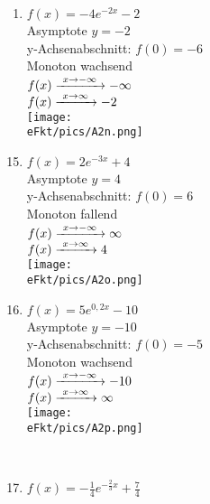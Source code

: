 \begin{Answer}[ref=eFktA2]
\begin{minipage}{\textwidth}
\begin{minipage}[t]{0.49\textwidth}
\begin{enumerate}[label=\alph*)]
				\item \(f(x)=-4e^{-2x}-2\)\\
				Asymptote \(y=-2\)\\
				y-Achsenabschnitt: \(f(0)=-6\)\\
				Monoton wachsend\\
				\(f(x)\xrightarrow{\hphantom{\ }x\to-\infty\hphantom{\ }}-\infty\)\\
				\(f(x)\xrightarrow{\hphantom{\ }x\to\infty\hphantom{\ }}-2\)\\
				\texttt{[image: \\eFkt/pics/A2n.png]}
			\end{enumerate}
		\end{minipage}
		\begin{minipage}[t]{0.49\textwidth}
			\begin{enumerate}[label=\alph*)]
				\setcounter{enumi}{14}
				\item \(f(x)=2e^{-3x}+4\)\\
				Asymptote \(y=4\)\\
				y-Achsenabschnitt: \(f(0)=6\)\\
				Monoton fallend\\
				\(f(x)\xrightarrow{\hphantom{\ }x\to-\infty\hphantom{\ }}\infty\)\\
				\(f(x)\xrightarrow{\hphantom{\ }x\to\infty\hphantom{\ }}4\)\\
				\texttt{[image: \\eFkt/pics/A2o.png]}
				\item \(f(x)=5e^{0,2x}-10\)\\
				Asymptote \(y=-10\)\\
				y-Achsenabschnitt: \(f(0)=-5\)\\
				Monoton wachsend\\
				\(f(x)\xrightarrow{\hphantom{\ }x\to-\infty\hphantom{\ }}-10\)\\
				\(f(x)\xrightarrow{\hphantom{\ }x\to\infty\hphantom{\ }}\infty\)\\
				\texttt{[image: \\eFkt/pics/A2p.png]}
			\end{enumerate}
		\end{minipage}
	\end{minipage}\\
	\newpage
	\begin{minipage}{\textwidth}
		\begin{minipage}[t]{0.49\textwidth}
			\begin{enumerate}[label=\alph*)]
				\setcounter{enumi}{16}
				\item \(f(x)=-\frac{1}{4}e^{-\frac{2}{3}x}+\frac{7}{4}\)\\

\end{enumerate}
\end{minipage}
\end{minipage}
\end{Answer}
